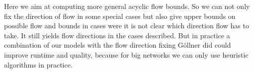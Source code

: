Here we aim at computing more general acyclic flow bounds. So we can not only fix the direction of flow in some special 
cases but also give upper bounds on possible flow and bounds in cases were it is not clear which direction flow has to 
take. It still yields flow directions in the cases described. But in practice a combination of our models with the 
flow direction fixing Göllner did could improve runtime and quality, because for big networks we can only use heuristic 
algorithms in practice.
